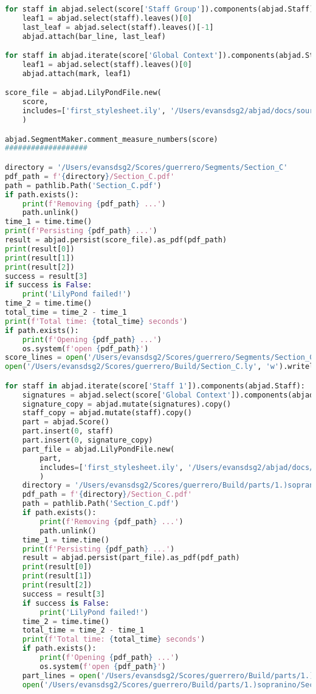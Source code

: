 \begin{lstlisting}[language=Python, caption=Invocation Source Code]
for staff in abjad.select(score['Staff Group']).components(abjad.Staff):
    leaf1 = abjad.select(staff).leaves()[0]
    last_leaf = abjad.select(staff).leaves()[-1]
    abjad.attach(bar_line, last_leaf)

for staff in abjad.iterate(score['Global Context']).components(abjad.Staff):
    leaf1 = abjad.select(staff).leaves()[0]
    abjad.attach(mark, leaf1)

score_file = abjad.LilyPondFile.new(
    score,
    includes=['first_stylesheet.ily', '/Users/evansdsg2/abjad/docs/source/_stylesheets/abjad.ily'],
    )

abjad.SegmentMaker.comment_measure_numbers(score)
###################

directory = '/Users/evansdsg2/Scores/guerrero/Segments/Section_C'
pdf_path = f'{directory}/Section_C.pdf'
path = pathlib.Path('Section_C.pdf')
if path.exists():
    print(f'Removing {pdf_path} ...')
    path.unlink()
time_1 = time.time()
print(f'Persisting {pdf_path} ...')
result = abjad.persist(score_file).as_pdf(pdf_path)
print(result[0])
print(result[1])
print(result[2])
success = result[3]
if success is False:
    print('LilyPond failed!')
time_2 = time.time()
total_time = time_2 - time_1
print(f'Total time: {total_time} seconds')
if path.exists():
    print(f'Opening {pdf_path} ...')
    os.system(f'open {pdf_path}')
score_lines = open('/Users/evansdsg2/Scores/guerrero/Segments/Section_C/Section_C.ly').readlines()
open('/Users/evansdsg2/Scores/guerrero/Build/Section_C.ly', 'w').writelines(score_lines[15:-1])

for staff in abjad.iterate(score['Staff 1']).components(abjad.Staff):
    signatures = abjad.select(score['Global Context']).components(abjad.Staff)
    signature_copy = abjad.mutate(signatures).copy()
    staff_copy = abjad.mutate(staff).copy()
    part = abjad.Score()
    part.insert(0, staff)
    part.insert(0, signature_copy)
    part_file = abjad.LilyPondFile.new(
        part,
        includes=['first_stylesheet.ily', '/Users/evansdsg2/abjad/docs/source/_stylesheets/abjad.ily'],
        )
    directory = '/Users/evansdsg2/Scores/guerrero/Build/parts/1.)sopranino'
    pdf_path = f'{directory}/Section_C.pdf'
    path = pathlib.Path('Section_C.pdf')
    if path.exists():
        print(f'Removing {pdf_path} ...')
        path.unlink()
    time_1 = time.time()
    print(f'Persisting {pdf_path} ...')
    result = abjad.persist(part_file).as_pdf(pdf_path)
    print(result[0])
    print(result[1])
    print(result[2])
    success = result[3]
    if success is False:
        print('LilyPond failed!')
    time_2 = time.time()
    total_time = time_2 - time_1
    print(f'Total time: {total_time} seconds')
    if path.exists():
        print(f'Opening {pdf_path} ...')
        os.system(f'open {pdf_path}')
    part_lines = open('/Users/evansdsg2/Scores/guerrero/Build/parts/1.)sopranino/Section_C.ly').readlines()
    open('/Users/evansdsg2/Scores/guerrero/Build/parts/1.)sopranino/Section_C.ly', 'w').writelines(part_lines[15:-1])


\end{lstlisting}
